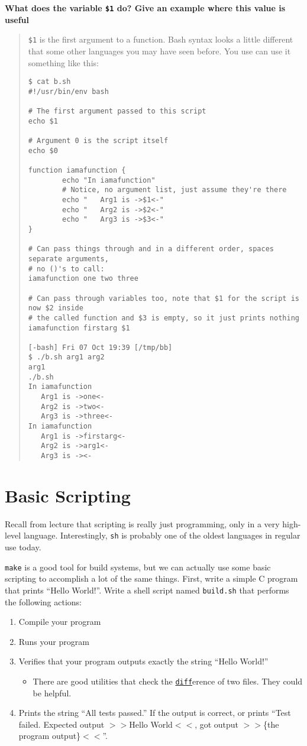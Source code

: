 \documentclass{article}
\begin{document}
\textbf{What does the variable \texttt{\$1} do? Give an example where this
value is useful}
\begin{quote}
  \color{violet}
  \texttt{\$1} is the first argument to a function. Bash syntax looks a little
  different that some other languages you may have seen before. You use can
  use it something like this:

  \begin{lstlisting}
$ cat b.sh
#!/usr/bin/env bash

# The first argument passed to this script
echo $1

# Argument 0 is the script itself
echo $0

function iamafunction {
       	echo "In iamafunction"
       	# Notice, no argument list, just assume they're there
       	echo "   Arg1 is ->$1<-"
       	echo "   Arg2 is ->$2<-"
       	echo "   Arg3 is ->$3<-"
}

# Can pass things through and in a different order, spaces separate arguments,
# no ()'s to call:
iamafunction one two three

# Can pass through variables too, note that $1 for the script is now $2 inside
# the called function and $3 is empty, so it just prints nothing
iamafunction firstarg $1

[-bash] Fri 07 Oct 19:39 [/tmp/bb]
$ ./b.sh arg1 arg2
arg1
./b.sh
In iamafunction
   Arg1 is ->one<-
   Arg2 is ->two<-
   Arg3 is ->three<-
In iamafunction
   Arg1 is ->firstarg<-
   Arg2 is ->arg1<-
   Arg3 is -><-
  \end{lstlisting}
\end{quote}


\newpage
\section{Basic Scripting}

Recall from lecture that scripting is really just programming, only in a very
high-level language. Interestingly, \texttt{sh} is probably one of the oldest
languages in regular use today.

\texttt{make} is a good tool for build systems, but we can actually use some
basic scripting to accomplish a lot of the same things.
First, write a simple C program that prints ``Hello World!''.
Write a shell script named \texttt{build.sh} that performs the following
actions:
\begin{enumerate}
  \item Compile your program
  \item Runs your program
  \item Verifies that your program outputs exactly the string ``Hello World!''
    \begin{itemize}
      \item There are good utilities that check the \texttt{\ul{diff}}erence of two
        files. They could be helpful.
    \end{itemize}
  \item Prints the string ``All tests passed.'' If the output is correct, or
    prints ``Test failed. Expected output $>>$Hello World$<<$, got
    output $>>$\{the program output\}$<<$''.
\end{enumerate}
\end{document}
